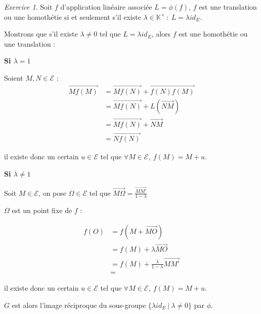 \documentclass[]{article}
\theoremstyle{remark}
\newtheorem{myexer}{Exercice}
\theoremstyle{definition}
\newenvironment{proofpart}[1]{
	\noindent
	{\textbf{\boldmath #1}}
}{
	\checkmark
}
\begin{document}
\begin{myexer}
	Soit $f$ d'application linéaire associée $L = \phi(f)$, $f$ est une translation ou une homothétie si et seulement s'il existe $\lambda \in \mathbb{K}^{\times} ~ : ~ L = \lambda id_E$.
	
	Montrons que s'il existe $\lambda \neq 0$ tel que $L = \lambda id_E$, alors $f$ est une homothétie ou une translation :
	
	\begin{proofpart}{Si $\lambda = 1$}

		Soient $M, N \in \mathcal{E}$ :
		$$
		\begin{aligned}
			\overrightarrow{M f(M)} &= \overrightarrow{M f(N)} + \overrightarrow{f(N) f(M)} \\
			& = \overrightarrow{M f(N)} + L\left(\overrightarrow{NM}\right)\\
			& = \overrightarrow{M f(N)} + \overrightarrow{NM} \\
			& = \overrightarrow{N f(N)}
		\end{aligned}
		$$
		
		il existe donc un certain $u \in \mathcal{E}$ tel que $\forall M \in \mathcal{E}, ~ f(M) = M+u$.
		
	\end{proofpart}
	
	
		\begin{proofpart}{Si $\lambda \neq 1$}
	
			Soit $M \in \mathcal{E}$, on pose $\Omega \in \mathcal{E}$ tel que $\displaystyle \overrightarrow{M\Omega} = \frac{\overrightarrow{MM'}}{1 - \lambda}$

			$\Omega$ est un point fixe de $f$ :

			$$
			\begin{aligned}
				f(O) &=f(M + \overrightarrow{MO}) \\
				&=f(M) + \lambda \overrightarrow{MO} \\
				&=f(M) + \frac{\lambda}{1-\lambda} \overrightarrow{MM'}\\
				&= 
			\end{aligned}
			$$
			
			il existe donc un certain $u \in \mathcal{E}$ tel que $\forall M \in \mathcal{E}, ~ f(M) = M+u$.
			
		\end{proofpart}
	
\end{myexer}

$G$ est alors l'image réciproque du sous-groupe $\{\lambda id_E ~ | ~ \lambda \neq 0\}$ par $\phi$.
\end{document}
